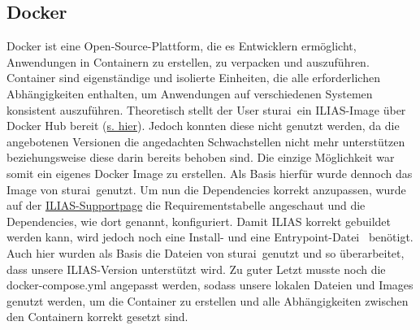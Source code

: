 \documentclass[10pt, a4paper,onecolumn ,titlepage]{article}
\begin{document}
    \subsection{Docker}
    \label{subsec:docker}
    Docker ist eine Open-Source-Plattform, die es Entwicklern ermöglicht, Anwendungen in Containern zu erstellen, zu verpacken und auszuführen.
    Container sind eigenständige und isolierte Einheiten, die alle erforderlichen Abhängigkeiten enthalten, um Anwendungen auf verschiedenen Systemen konsistent auszuführen.\parencite{docker}
    Theoretisch stellt der User \glqq sturai\grqq\ ein ILIAS-Image über Docker Hub bereit (\href{https://hub.docker.com/r/sturai/ilias#!}{s. hier}).
    Jedoch konnten diese nicht genutzt werden, da die angebotenen Versionen die angedachten Schwachstellen nicht mehr unterstützen beziehungsweise diese darin bereits behoben sind.
    Die einzige Möglichkeit war somit ein eigenes Docker Image zu erstellen. Als Basis hierfür wurde dennoch das Image von \glqq sturai\grqq\ genutzt.
    Um nun die Dependencies korrekt anzupassen, wurde auf der \href{https://docu.ilias.de/goto_docu_lm_367.html}{ILIAS-Supportpage} die Requirementstabelle angeschaut und die Dependencies, wie dort genannt, konfiguriert.
    Damit ILIAS korrekt gebuildet werden kann, wird jedoch noch eine Install- und eine Entrypoint-Datei~\parencite{dockerEntrypoints} benötigt.
    Auch hier wurden als Basis die Dateien von \glqq sturai\grqq\ genutzt und so überarbeitet, dass unsere ILIAS-Version unterstützt wird.
    Zu guter Letzt musste noch die docker-compose.yml angepasst werden, sodass unsere lokalen Dateien und Images genutzt werden, um die Container zu erstellen und alle Abhängigkeiten zwischen den Containern korrekt gesetzt sind.
\end{document}
